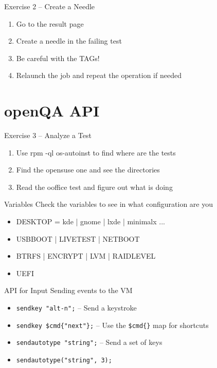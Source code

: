\documentclass{beamer}
\begin{document}
%
%
\begin{frame}{Exercise 2 -- Create a Needle}
  \begin{enumerate}
  \item Go to the result page
  \item Create a needle in the failing test
  \item Be careful with the TAGs!
  \item Relaunch the job and repeat the operation if needed
  \end{enumerate}
\end{frame}


\section{openQA API}
%
%
\begin{frame}{Exercise 3 -- Analyze a Test}
  \begin{enumerate}
  \item Use rpm -ql os-autoinst to find where are the tests
  \item Find the opensuse one and see the directories
  \item Read the ooffice test and figure out what is doing
  \end{enumerate}
\end{frame}

%
%
\begin{frame}{Variables}
  Check the variables to see in what configuration are you
  \begin{itemize}
  \item DESKTOP = kde | gnome | lxde | minimalx ...
  \item USBBOOT | LIVETEST | NETBOOT
  \item BTRFS | ENCRYPT | LVM | RAIDLEVEL
  \item UEFI
  \end{itemize}
\end{frame}

\begin{frame}{API for Input}
  Sending events to the VM
  \begin{itemize}
  \item \texttt{sendkey "alt-n";} -- Send a keystroke
  \item \texttt{sendkey \$cmd\{"next"\};} -- Use the \texttt{\$cmd\{\}} map for shortcuts
  \item \texttt{sendautotype "string";} -- Send a set of keys
  \item \texttt{sendautotype("string", 3);}
  \end{itemize}
\end{frame}
\end{document}
